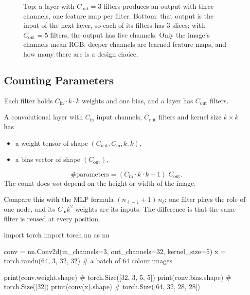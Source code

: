 \documentclass[12pt, a4paper]{article}
\begin{document}
\begin{figure}[H]
  \caption{Top: a layer with $C_{\text{out}} = 3$ filters produces an output
    with three channels, one feature map per filter. Bottom: that output is
    the input of the next layer, so each of its filters has $3$ slices; with
    $C_{\text{out}} = 5$ filters, the output has five channels. Only the
    image's channels mean RGB; deeper channels are learned feature maps, and
    how many there are is a design choice.}
  \label{fig:filters}
\end{figure}

\subsection{Counting Parameters}

Each filter holds $C_{\text{in}} \cdot k \cdot k$ weights and one bias, and a
layer has $C_{\text{out}}$ filters.

\begin{resultbox}
  A convolutional layer with $C_{\text{in}}$ input channels, $C_{\text{out}}$
  filters and kernel size $k \times k$ has
  \begin{itemize}[nosep]
    \item a weight tensor of shape $(C_{\text{out}}, C_{\text{in}}, k, k)$,
    \item a bias vector of shape $(C_{\text{out}})$,
  \end{itemize}
  \[
    \#\text{parameters} = (C_{\text{in}} \cdot k \cdot k + 1)\; C_{\text{out}} .
  \]
  The count does \emph{not} depend on the height or width of the image.
\end{resultbox}

Compare this with the MLP formula $(n_{\ell-1} + 1)\,n_\ell$: one filter
plays the role of one node, and its $C_{\text{in}} k^2$ weights are its
inputs. The difference is that the same filter is reused at every position.

\begin{codebox}
import torch
import torch.nn as nn

conv = nn.Conv2d(in_channels=3, out_channels=32, kernel_size=5)
x = torch.randn(64, 3, 32, 32)      # a batch of 64 colour images

print(conv.weight.shape)   # torch.Size([32, 3, 5, 5])
print(conv.bias.shape)     # torch.Size([32])
print(conv(x).shape)       # torch.Size([64, 32, 28, 28])
\end{codebox}
\end{document}

